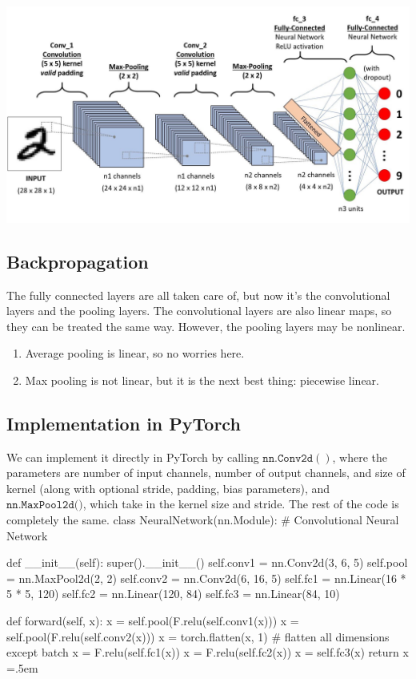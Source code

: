 \documentclass{article}
\newenvironment{cverbatim}
    {\SaveVerbatim{cverb}}
    {\endSaveVerbatim
      \flushleft\fboxrule=0pt\fboxsep=.5em
      \colorbox{cverbbg}{%
        \makebox[\dimexpr\linewidth-2\fboxsep][l]{\BUseVerbatim{cverb}}%
      }
      \endflushleft
  }
\theoremstyle{definition}
\theoremstyle{remark}
\theoremstyle{definition}
\begin{document}
    \begin{center}
        \includegraphics[scale=0.25]{Images/CNNs/CNN_architecture.jpeg}
    \end{center}

    \subsection{Backpropagation}

    The fully connected layers are all taken care of, but now it's the convolutional layers and the pooling layers. The convolutional layers are also linear maps, so they can be treated the same way. However, the pooling layers may be nonlinear. 
    \begin{enumerate}
      \item Average pooling is linear, so no worries here. 
      \item Max pooling is not linear, but it is the next best thing: piecewise linear. 
    \end{enumerate}

    \subsection{Implementation in PyTorch}

    We can implement it directly in PyTorch by calling $\texttt{nn.Conv2d}()$, where the parameters are number of input channels, number of output channels, and size of kernel (along with optional stride, padding, bias parameters), and $\texttt{nn.MaxPool2d()}$, which take in the kernel size and stride. The rest of the code is completely the same. 
    \begin{cverbatim}
    class NeuralNetwork(nn.Module):
        # Convolutional Neural Network 

        def __init__(self):
            super().__init__()
            self.conv1 = nn.Conv2d(3, 6, 5)
            self.pool = nn.MaxPool2d(2, 2)
            self.conv2 = nn.Conv2d(6, 16, 5)
            self.fc1 = nn.Linear(16 * 5 * 5, 120)
            self.fc2 = nn.Linear(120, 84)
            self.fc3 = nn.Linear(84, 10)


        def forward(self, x):
            x = self.pool(F.relu(self.conv1(x)))
            x = self.pool(F.relu(self.conv2(x)))
            x = torch.flatten(x, 1) # flatten all dimensions except batch
            x = F.relu(self.fc1(x))
            x = F.relu(self.fc2(x))
            x = self.fc3(x)
            return x
    \end{cverbatim}
\end{document}
